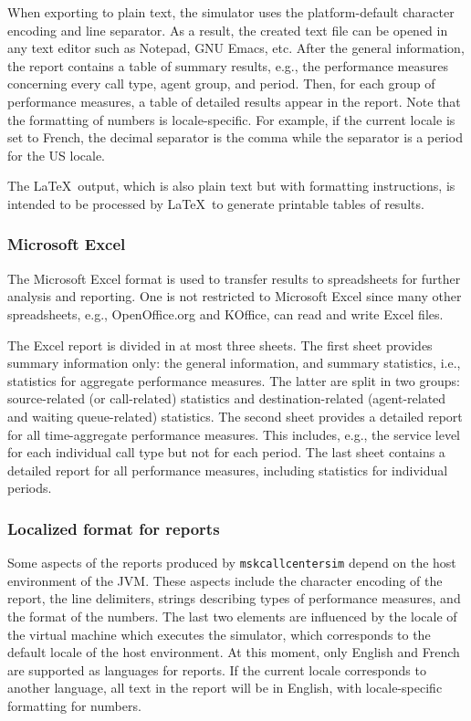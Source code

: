 When exporting to plain text, the simulator uses the
platform-default character encoding and line separator.
As a result, the created text file can be opened in any text editor
such as Notepad, GNU Emacs, etc.
After the general information, the report contains a table of summary
results, e.g., the performance measures concerning every call type,
agent group, and period.  Then, for each group of performance
measures, a table of detailed results appear in the report.
Note that the formatting of numbers is locale-specific.  For example,
if the current locale is set to French, the decimal separator
is the comma while the separator is a period for the US locale.

The \LaTeX\ output, which is also plain text but with formatting
instructions,
is intended to be processed by \LaTeX\ to generate printable tables of
results.

\subsubsection{Microsoft Excel}

The Microsoft Excel format is used to transfer results to spreadsheets
for further analysis and reporting.
One is not restricted to Microsoft Excel since
many other spreadsheets, e.g., OpenOffice.org and KOffice,
can read and write Excel files.

The Excel report is divided in at most three sheets.
The first sheet provides summary information only: the general
information, and summary statistics, i.e., statistics for aggregate
performance measures.
The latter are split in two groups: source-related (or call-related)
statistics and destination-related (agent-related and waiting
queue-related) statistics.
The second sheet provides a detailed report for all time-aggregate
performance measures.  This includes, e.g., the service level for
each individual call type but not for each period.
The last sheet contains a detailed report for all performance
measures, including statistics for individual periods.

\subsubsection{Localized format for reports}

Some aspects of the reports produced by \texttt{mskcallcentersim}
depend on the host environment of the JVM.
These aspects include the character encoding of the report,
the line delimiters, strings describing types of performance measures,
and the format of the numbers.
The last two elements are influenced by the locale of the virtual
machine which executes the simulator, which corresponds to the default
locale of the host environment.
At this moment, only English and French are supported as languages for
reports. If the current locale corresponds to another language,
all text in the report will be in English, with locale-specific
formatting for numbers.

